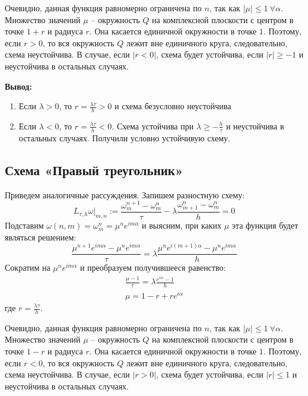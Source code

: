 \documentclass[titlepage]{article}
\def\le{\leqslant}
\def\ge{\geqslant}
\begin{document}
Очевидно, данная функция равномерно ограничена по $n$, так как $|\mu| \le 1 \ \forall \alpha$.
Множество значений $\mu$ -- окружность $Q$ на комплексной плоскости с центром в точке $1+r$ и радиуса $r$. Она касается единичной окружности в точке $1$. Поэтому, если $r > 0$, то вся окружность $Q$ лежит вне единичного круга, следовательно, схема неустойчива. В случае, если $|r < 0|$, схема будет устойчива, если $|r| \ge -1$ и неустойчива в остальных случаях. 
\hfill \break
\hfill \break
\hfill \break

\textbf{Вывод:} 
\begin{enumerate}
	\item Если $\lambda > 0$, то $r = \frac{\lambda\tau}{h} > 0$ и схема безусловно неустойчива
	\item Если $\lambda < 0$, то $r = \frac{\lambda\tau}{h} < 0$. Схема устойчива при $\lambda \ge -\frac{h}{\tau}$ и неустойчива в остальных случаях. Получили условно устойчивую схему.
\end{enumerate}

\subsection{Схема «Правый треугольник»}
Приведем аналогичные рассуждения. Запишем разностную схему:
\begin{equation*}
	L_{\tau,h}{\omega} |_{m,n} := \frac{\omega_m^{n+1} - \omega_m^n}{\tau} - \lambda\frac{\omega_{m+1}^n - \omega_m^n}{h} = 0
\end{equation*}
Подставим $\omega(n,m) = \omega_m^n = \mu^ne^{im\alpha}$ и выясним, при каких $\mu$ эта функция будет являться решением:
\begin{equation*}
	\frac{\mu^{n+1}e^{im\alpha} - \mu^ne^{im\alpha}}{\tau} = \lambda\frac{\mu^ne^{i(m+1)\alpha} - \mu^ne^{im\alpha}}{h}
\end{equation*}
Сократим на $\mu^ne^{im\alpha}$ и преобразуем получившееся равенство:
\begin{gather*}
	\frac{\mu-1}{\tau} = \lambda\frac{e^{i\alpha} - 1}{h} \\
	\mu = 1 - r + re^{i\alpha}
\end{gather*}
где $r = \frac{\lambda\tau}{h}$.

Очевидно, данная функция равномерно ограничена по $n$, так как $|\mu| \le 1 \ \forall \alpha$.
Множество значений $\mu$ -- окружность $Q$ на комплексной плоскости с центром в точке $1-r$ и радиуса $r$. Она касается единичной окружности в точке $1$. Поэтому, если $r < 0$, то вся окружность $Q$ лежит вне единичного круга, следовательно, схема неустойчива. В случае, если $|r > 0|$, схема будет устойчива, если $|r| \le 1$ и неустойчива в остальных случаях. 
\hfill \break
\end{document}
